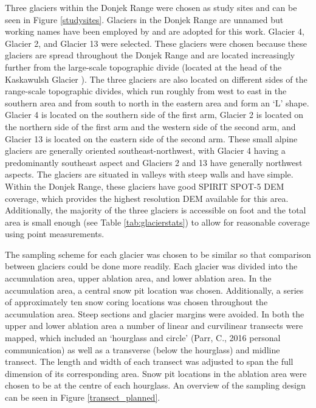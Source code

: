 \documentclass{sfuthesis}
\begin{document}
Three glaciers within the Donjek Range were chosen as study sites and can be seen in Figure \ref{studysites}. Glaciers in the Donjek Range are unnamed but working names have been employed by \cite{Crompton2016} and are adopted for this work. Glacier 4, Glacier 2, and Glacier 13 were selected. These glaciers were chosen because these glaciers are spread throughout the Donjek Range and are located increasingly further from the large-scale topographic divide (located at the head of the Kaskawulsh Glacier \citep{Taylor1969}). The three glaciers are also located on different sides of the range-scale topographic divides, which run roughly from west to east in the southern area and from south to north in the eastern area and form an `L' shape. Glacier 4 is located on the southern side of the first arm, Glacier 2 is located on the northern side of the first arm and the western side of the second arm, and Glacier 13 is located on the eastern side of the second arm. These small alpine glaciers are generally oriented southeast-northwest, with Glacier 4 having a predominantly southeast aspect and Glaciers 2 and 13 have generally northwest aspects. The glaciers are situated in valleys with steep walls and have simple. Within the Donjek Range, these glaciers have good SPIRIT SPOT-5 DEM coverage, which provides the highest resolution DEM available for this area. Additionally, the majority of the three glaciers is accessible on foot and the total area is small enough (see Table \ref{tab:glacierstats}) to allow for reasonable coverage using point measurements.

The sampling scheme for each glacier was chosen to be similar so that comparison between glaciers could be done more readily. Each glacier was divided into the accumulation area, upper ablation area, and lower ablation area. In the accumulation area, a central snow pit location was chosen. Additionally, a series of approximately ten snow coring locations was chosen throughout the accumulation area. Steep sections and glacier margins were avoided. In both the upper and lower ablation area a number of linear and curvilinear transects were mapped, which included an `hourglass and circle' (Parr, C., 2016 personal communication) as well as a transverse (below the hourglass) and midline transect. The length and width of each transect was adjusted to span the full dimension of its corresponding area. Snow pit locations in the ablation area were chosen to be at the centre of each hourglass. An overview of the sampling design can be seen in Figure \ref{transect_planned}.
\end{document}
